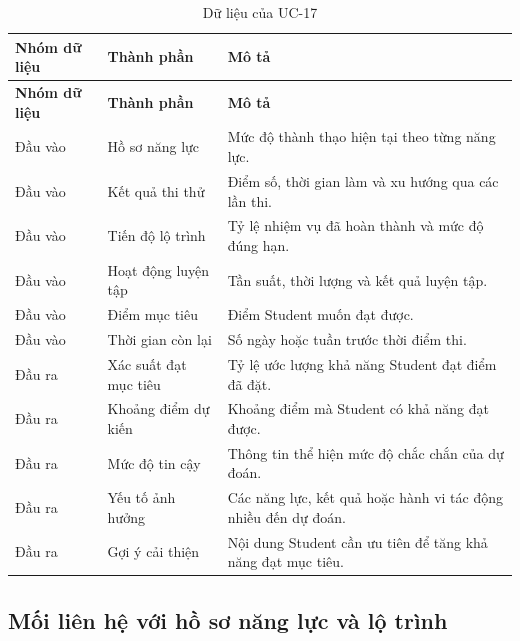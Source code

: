\begin{longtable}{|p{3.5cm}|p{5.3cm}|p{5.6cm}|}
	\caption{Dữ liệu của UC-17}
	\label{tab:uc17-data}\\
	\hline
	\textbf{Nhóm dữ liệu} &
	\textbf{Thành phần} &
	\textbf{Mô tả} \\
	\hline
	\endfirsthead
	
	\hline
	\textbf{Nhóm dữ liệu} &
	\textbf{Thành phần} &
	\textbf{Mô tả} \\
	\hline
	\endhead
	
	Đầu vào &
	Hồ sơ năng lực &
	Mức độ thành thạo hiện tại theo từng năng lực. \\
	\hline
	
	Đầu vào &
	Kết quả thi thử &
	Điểm số, thời gian làm và xu hướng qua các lần thi. \\
	\hline
	
	Đầu vào &
	Tiến độ lộ trình &
	Tỷ lệ nhiệm vụ đã hoàn thành và mức độ đúng hạn. \\
	\hline
	
	Đầu vào &
	Hoạt động luyện tập &
	Tần suất, thời lượng và kết quả luyện tập. \\
	\hline
	
	Đầu vào &
	Điểm mục tiêu &
	Điểm Student muốn đạt được. \\
	\hline
	
	Đầu vào &
	Thời gian còn lại &
	Số ngày hoặc tuần trước thời điểm thi. \\
	\hline
	
	Đầu ra &
	Xác suất đạt mục tiêu &
	Tỷ lệ ước lượng khả năng Student đạt điểm đã đặt. \\
	\hline
	
	Đầu ra &
	Khoảng điểm dự kiến &
	Khoảng điểm mà Student có khả năng đạt được. \\
	\hline
	
	Đầu ra &
	Mức độ tin cậy &
	Thông tin thể hiện mức độ chắc chắn của dự đoán. \\
	\hline
	
	Đầu ra &
	Yếu tố ảnh hưởng &
	Các năng lực, kết quả hoặc hành vi tác động nhiều đến dự đoán. \\
	\hline
	
	Đầu ra &
	Gợi ý cải thiện &
	Nội dung Student cần ưu tiên để tăng khả năng đạt mục tiêu. \\
	\hline
	
\end{longtable}

\subsection{Mối liên hệ với hồ sơ năng lực và lộ trình}

